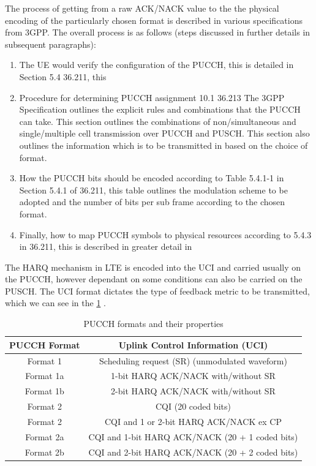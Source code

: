 \documentclass{article}
\begin{document}
The process of getting from a raw ACK/NACK value to the  the physical encoding of the particularly chosen format is described in various specifications from 3GPP. The overall process is as follows (steps discussed in further details in subsequent paragraphs):
\begin{enumerate}\label{proc_pucch_configs}
    \item The UE would verify the configuration of the PUCCH, this is detailed in Section 5.4 36.211, this 
    \item Procedure for determining PUCCH assignment 10.1 36.213 The 3GPP Specification outlines the explicit rules and combinations that the PUCCH can take. This section outlines the combinations of non/simultaneous and single/multiple cell transmission over PUCCH and PUSCH. This section also outlines the information which is to be transmitted in based on the choice of format. 
    \item How the PUCCH bits should be encoded according to Table 5.4.1-1 in Section 5.4.1 of 36.211, this table outlines the modulation scheme to be adopted and the number of bits per sub frame according to the chosen format.
    \item Finally, how to map PUCCH symbols to physical resources according to 5.4.3 in 36.211, this is described in greater detail in  
\end{enumerate} 
The HARQ mechanism in LTE is encoded into the UCI and carried usually on the PUCCH, however dependant on some conditions can also be carried on the PUSCH. The UCI format dictates the type of feedback metric to be transmitted, which we can see in the \cref{tab:pucch_formats} \cite[Section 17.3.1.2]{umts_sesia}. 

\begin{table}[h]
\centering
\begin{tabular}{||c| c||} 
\hline
PUCCH Format & Uplink Control Information (UCI) \\ [0.1ex] 
\hline\hline
Format 1 & Scheduling request (SR) (unmodulated waveform)\\ 
\hline
Format 1a & 1-bit HARQ ACK/NACK with/without SR\\
\hline
Format 1b & 2-bit HARQ ACK/NACK with/without SR\\
\hline
Format 2 &  CQI (20 coded bits)\\
\hline
Format 2 & CQI and 1 or 2-bit HARQ ACK/NACK ex CP\\
\hline
Format 2a & CQI and 1-bit HARQ ACK/NACK (20 + 1 coded bits)\\
\hline
Format 2b & CQI and 2-bit HARQ ACK/NACK (20 + 2 coded bits)\\
\hline
\end{tabular}
\caption{PUCCH formats and their properties}
\label{tab:pucch_formats}
\end{table}
\end{document}
